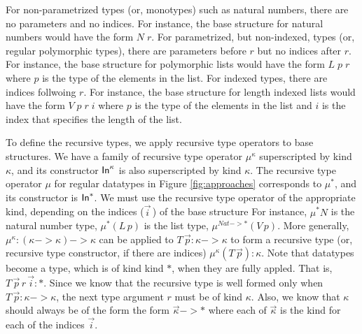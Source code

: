 For non-parametrized types (or, monotypes) such as natural numbers,
there are no parameters and no indices. For instance, the base structure
for natural numbers would have the form $N\;r$. For parametrized,
but non-indexed, types (or, regular polymorphic types), there are parameters
before $r$ but no indices after $r$. For instance, the base structure for
polymorphic lists would have the form $L\;p\;r$ where $p$ is the type of
the elements in the list. For indexed types, there are indices follwoing $r$.
For instance, the base structure for length indexed lists would have the
form $V\;p\;r\;i$ where $p$ is the type of the elements in the list and
$i$ is the index that specifies the length of the list.

To define the recursive types, we apply recursive type operators to
base structures. We have a family of recursive type operator $\mu^\kappa$
superscripted by kind $\kappa$, and its constructor $\textsf{In}^\kappa$ is also
superscripted by kind $\kappa$. The recursive type operator $\mu$
for regular datatypes in Figure \ref{fig:approaches} corresponds to $\mu^{*}$,
and its constructor is $\textsf{In}^{*}$.
We must use the recursive type operator of the appropriate kind,
depending on the indices ($\vec{i}\,$) of the base structure
For instance, $\mu^{*}N$ is the natural number type,
$\mu^{*}(L\,p)$ is the list type, $\mu^{\textit{Nat}-> *}(V\,p)$.
More generally, $\mu^\kappa : (\kappa -> \kappa) -> \kappa$ can be
applied to $T\,\vec{p} : \kappa -> \kappa$ to form a recursive type
(or, recursive type constructor, if there are indices)
$\mu^\kappa(T\,\vec{p}) : \kappa$. Note that datatypes become a type,
which is of kind kind $*$, when they are fully appled. That is,
$T\,\vec{p}\,r\,\vec{i} : *$. Since we know that the recursive type is
well formed only when $T\,\vec{p} : \kappa -> \kappa$,
the next type argument $r$ must be of kind $\kappa$.
Also, we know that $\kappa$ should always be of the form the form
$\vec{\kappa} -> *$ where each of $\vec{\kappa}$ is the kind for
each of the indices $\vec{i}$.

